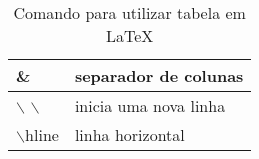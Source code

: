 \documentclass[12pt, a4paper]{article}
\begin{document}
\begin{table}[h]
	\centering
	\begin{tabular}{|l|l|}
	\hline
	\& & separador de colunas \\
	\hline
	$\backslash$ $\backslash$ & inicia uma nova linha \\
	\hline
	$\backslash$hline & linha horizontal \\
	\hline
	\end{tabular}
\caption{Comando para utilizar tabela em LaTeX}
\label{tab2}
\end{table}
\end{document}
